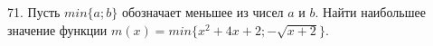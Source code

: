 71. Пусть $min\{a;b\}$ обозначает меньшее из чисел $a$ и $b.$ Найти наибольшее значение функции $m(x)=min\{x^2+4x+2; -\sqrt{x+2}\}.$\\
